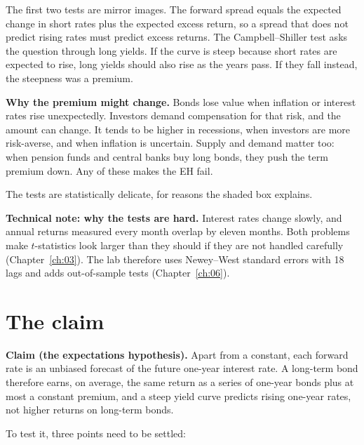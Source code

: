 The first two tests are mirror images. The forward spread equals the expected change in short rates plus the expected excess return, so a spread that does not predict rising rates must predict excess returns. The Campbell--Shiller test asks the question through long yields. If the curve is steep because short rates are expected to rise, long yields should also rise as the years pass. If they fall instead, the steepness was a premium.

\textbf{Why the premium might change.} Bonds lose value when inflation or interest rates rise unexpectedly. Investors demand compensation for that risk, and the amount can change. It tends to be higher in recessions, when investors are more risk-averse, and when inflation is uncertain. Supply and demand matter too: when pension funds and central banks buy long bonds, they push the term premium down. Any of these makes the EH fail.

The tests are statistically delicate, for reasons the shaded box explains.

\begin{technote}
\textbf{Technical note: why the tests are hard.} Interest rates change slowly, and annual returns measured every month overlap by eleven months. Both problems make $t$-statistics look larger than they should if they are not handled carefully (Chapter~\ref{ch:03}). The lab therefore uses Newey--West standard errors with 18 lags and adds out-of-sample tests (Chapter~\ref{ch:06}).
\end{technote}


\section{The claim}
\label{sec:07-claim}

\begin{callout}
\textbf{Claim (the expectations hypothesis).} Apart from a constant, each forward rate is an unbiased forecast of the future one-year interest rate. A long-term bond therefore earns, on average, the same return as a series of one-year bonds plus at most a constant premium, and a steep yield curve predicts rising one-year rates, not higher returns on long-term bonds.
\end{callout}

To test it, three points need to be settled:


